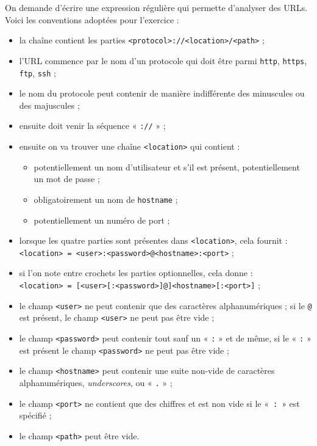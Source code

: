 \begin{exercise}[title=Décortiquer une URL, level=advanced]
On demande d'écrire une expression régulière qui permette d'analyser des URLs.
Voici les conventions adoptées pour l'exercice :
\begin{itemize}
\item la chaîne contient les parties \texttt{<protocol>://<location>/<path>} ;
\item l'URL commence par le nom d'un protocole qui doit être parmi \texttt{http}, \texttt{https}, \texttt{ftp}, \texttt{ssh} ;
\item le nom du protocole peut contenir de manière indifférente des minuscules ou des majuscules ;
\item ensuite doit venir la séquence « \texttt{://} » ;
\item ensuite on va trouver une chaîne \texttt{<location>} qui contient :
	\begin{itemize}\jazzitem
  	\item potentiellement un nom d'utilisateur et s'il est présent, potentiellement un mot de passe ;
    \item obligatoirement un nom de \texttt{hostname} ;
    \item potentiellement un numéro de port ;
  \end{itemize}
\item lorsque les quatre parties sont présentes dans \texttt{<location>}, cela fournit : 
	\texttt{<location> = <user>:<password>@<hostname>:<port>} ;
\item si l'on note entre crochets les parties optionnelles, cela donne :\\
	\texttt{<location> = [<user>[:<password>]@]<hostname>[:<port>]} ;
\item le champ \texttt{<user>} ne peut contenir que des caractères alphanumériques ; si le \texttt{@} est présent, le champ \texttt{<user>} ne peut pas être vide ;
\item le champ \texttt{<password>} peut contenir tout sauf un « \texttt{:} » et de même, si le « \texttt{:} » est présent le champ \texttt{<password>} ne peut pas être vide ;
\item le champ \texttt{<hostname>} peut contenir une suite non-vide de caractères alphanumériques, \textit{underscores}, ou « \texttt{.} » ;
\item le champ \texttt{<port>} ne contient que des chiffres et est non vide si le «~\texttt{:}~» est spécifié ;
\item le champ \texttt{<path>} peut être vide.
\end{itemize}


\vspace{-\baselineskip}
\end{exercise}

